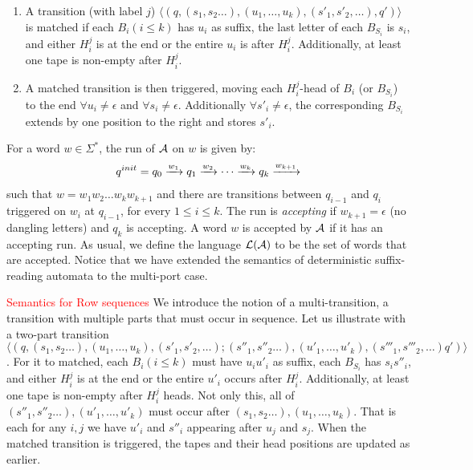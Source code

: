 \begin{enumerate}
\item A transition (with label $j$) $\langle (q, (s_1, s_2 \dots), (u_1, \dots, u_k), (s'_1,s'_2,\dots), q') \rangle$ is matched if each $B_i (i\le k)$ has $u_i$ as suffix, the last letter of each $B_{S_i}$ is $s_i$, and either $H_{i}^{j}$ is at the end or the entire $u_i$ is after $H_{i}^{j}$. Additionally, at least one tape is non-empty after $H_{i}^{j}$.

\item A matched transition is then triggered, moving each $H_{i}^{j}$-head of $B_i$ (or $B_{S_i}$) to the end $\forall u_i \ne \epsilon$ and $\forall s_i \ne \epsilon$. Additionally $\forall s'_i \ne \epsilon$, the corresponding $B_{S_i}$ extends by one position to the right and stores $s'_i$.
\end{enumerate}


 For a word $w \in \Sigma^*$, the run of \mdsa $\mathcal{A}$ on $w$ is given by:
 \begin{align*}
   q^{init} = q_0 \xrightarrow{w_1} q_1 \xrightarrow{w_2} \cdots \xrightarrow{w_{k}} q_k \xrightarrow{w_{k+1}}
 \end{align*}
 such that $w = w_1 w_2 \dots w_kw_{k+1}$ and there are transitions
 between $q_{i-1}$ and $q_i$ triggered on $w_i$ at $q_{i-1}$, for
 every $1 \le i \le k$. The run is \emph{accepting} if
 $w_{k+1} = \epsilon$ (no dangling letters) and $q_k$ is accepting. A
 word $w$ is accepted by \mdsa $\mathcal{A}$ if it has an accepting run. As
 usual, we define the language $\mathcal{L}(\mathcal{A})$ to be the set of words that
 are accepted. Notice that we have extended the semantics of
 deterministic suffix-reading automata to the multi-port
 case. %

\textcolor{red}{Semantics for Row sequences}
We introduce the notion of a multi-transition, a transition with multiple parts that must occur in sequence. Let us illustrate with a two-part transition $\langle (q, (s_1, s_2 \dots), (u_1, \dots, u_k), (s'_1,s'_2,\dots); (s''_1, s''_2 \dots), (u'_1, \dots, u'_k), (s'''_1,s'''_2,\dots) q') \rangle$. For it to matched, each $B_i (i\le k)$ must have $u_i  u'_i$ as suffix, each $B_{S_i}$ has $s_i  s''_i$, and either $H_{i}^{j}$ is at the end or the entire $u'_i$ occurs after $H_i^j$. Additionally, at least one tape is non-empty after $H_i^j$ heads. Not only this, all of $(s''_1, s''_2 \dots), (u'_1, \dots, u'_k)$ must occur after $(s_1, s_2 \dots), (u_1, \dots, u_k)$. That is each for any $i,j$ we have $u'_i$ and $s''_i$ appearing after $u_j$ and $s_j$. When the matched transition is triggered, the tapes and their head positions are updated as earlier.

